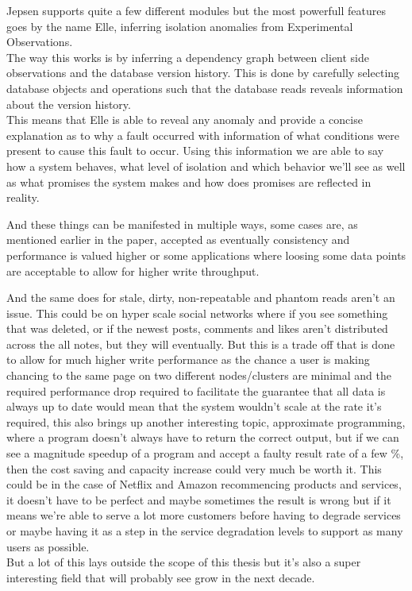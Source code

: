 \documentclass[a4paper,10pt,titlepage]{report}
\begin{document}
Jepsen supports quite a few different modules but the most powerfull features goes by the name Elle, inferring isolation anomalies from Experimental Observations. \\
\vspace{5mm}
The way this works is by inferring a dependency graph between client side observations and the database version history. This is done by carefully selecting database objects and operations such that the database reads reveals information about the version history.\\
\vspace{5mm}
This means that Elle is able to reveal any anomaly and provide a concise explanation as to why a fault occurred with information of what conditions were present to cause this fault to occur. Using this information we are able to say how a system behaves, what level of isolation and which behavior we'll see as well as what promises the system makes and how does promises are reflected in reality.\\
\vspace{5mm}

And these things can be manifested in multiple ways, some cases are, as mentioned earlier in the paper, accepted as eventually consistency and performance is valued higher or some applications where loosing some data points are acceptable to allow for higher write throughput.\\
\vspace{5mm}

And the same does for stale, dirty, non-repeatable and phantom reads aren't an issue. This could be on hyper scale social networks where if you see something that was deleted, or if the newest posts, comments and likes aren't distributed across the all notes, but they will eventually. But this is a trade off that is done to allow for much higher write performance as the chance a user is making chancing to the same page on two different nodes/clusters are minimal and the required performance drop required to facilitate the guarantee that all data is always up to date would mean that the system wouldn't scale at the rate it's required, this also brings up another interesting topic, approximate programming, where a program doesn't always have to return the correct output, but if we can see a magnitude speedup of a program and accept a faulty result rate of a few \%, then the cost saving and capacity increase could very much be worth it. This could be in the case of Netflix and Amazon recommencing products and services, it doesn't have to be perfect and maybe sometimes the result is wrong but if it means we're able to serve a lot more customers before having to degrade services or maybe having it as a step in the service degradation levels to support as many users as possible. \\
\vspace{5mm}
But a lot of this lays outside the scope of this thesis but it's also a super interesting field that will probably see grow in the next decade.
\end{document}

